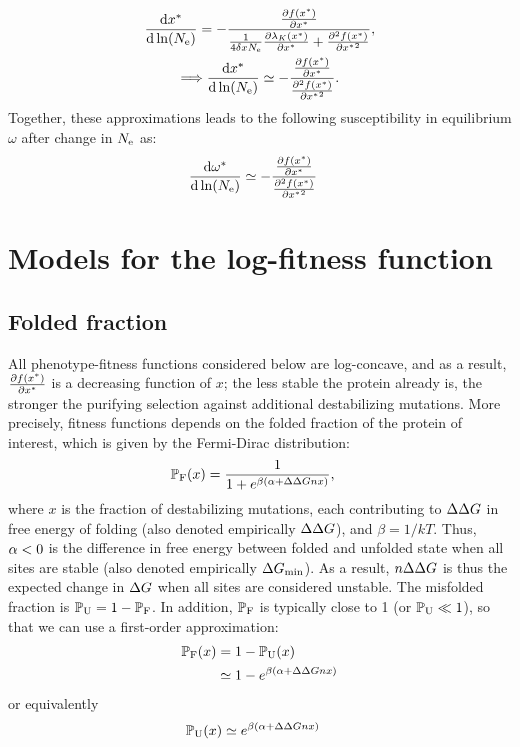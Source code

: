 \begin{gather}
    \frac{ \text{d} x^{*}}{\text{d} \ln (N_{\text{e}})}  = - \frac{\frac{ \partial f (x^{*}) }{\partial {x^{*}}}}{\frac{1}{4 \delta x N_{\text{e}}} \frac{\partial \lambda_K (x^{*}) }{\partial x^{*} } + \frac{ \partial^2 f (x^{*}) }{\partial {x^{*}}^2}},\\
    \Longrightarrow \frac{ \text{d} x^{*}}{\text{d} \ln (N_{\text{e}})}  \simeq - \frac{\frac{ \partial f (x^{*}) }{\partial {x^{*}}}}{\frac{ \partial^2 f (x^{*}) }{\partial {x^{*}}^2}}. \label{eq:approx_dx_dlnNe}
\end{gather}
Together, these approximations leads to the following susceptibility in equilibrium $\omega$ after change in $N_{\text{e}}$ as:
\begin{align}
    \frac{ \text{d} \omega^{*}}{\text{d} \ln (N_{\text{e}})} & \simeq - \frac{\frac{ \partial f (x^{*}) }{\partial {x^{*}}}}{\frac{ \partial^2 f (x^{*}) }{\partial {x^{*}}^2}}
    \label{eq:approx_dw_dlnNe}
\end{align}


\section{Models for the log-fitness function}
\label{sec:models-for-the-log-fitness-function}

\subsection{Folded fraction}
\label{subsec:folded-fraction}

All phenotype-fitness functions considered below are log-concave, and as a result, $\frac{ \partial f (x^{*}) }{\partial {x^{*}}}$ is a decreasing function of $x$; the less stable the protein already is, the stronger the purifying selection against additional destabilizing mutations. More precisely, fitness functions depends on the folded fraction of the protein of interest, which is given by the Fermi-Dirac distribution:
\begin{align}
    \mathbb{P}_{\text{F}} (x) & = \frac{1}{1 + e^{\beta(\alpha + \Delta \Delta G n x)}},
\end{align}
where $x$ is the fraction of destabilizing mutations, each contributing to $\Delta \Delta G$ in free energy of folding (also denoted empirically $\Delta \Delta G$), and $\beta = 1 / kT$.
Thus, $\alpha < 0$ is the difference in free energy between folded and unfolded state when all sites are stable (also denoted empirically $\Delta G_{\text{min}}$).
As a result, $n \Delta \Delta G$ is thus the expected change in $\Delta G$ when all sites are considered unstable.
The misfolded fraction is  $\mathbb{P}_{\text{U}} = 1-\mathbb{P}_{\text{F}}$.
In addition, $\mathbb{P}_{\text{F}}$ is typically close to 1 (or $\mathbb{P}_{\text{U}} \ll 1$), so that we can use a first-order approximation:
\begin{align}
    \mathbb{P}_{\text{F}}(x) & = 1 - \mathbb{P}_{\text{U}}(x) \\
    & \simeq 1 - e^{\beta(\alpha + \Delta \Delta G n x)}
\end{align}
or equivalently
\begin{align}
    \mathbb{P}_{\text{U}}(x) & \simeq e^{\beta(\alpha + \Delta \Delta G n x)}
\end{align}

